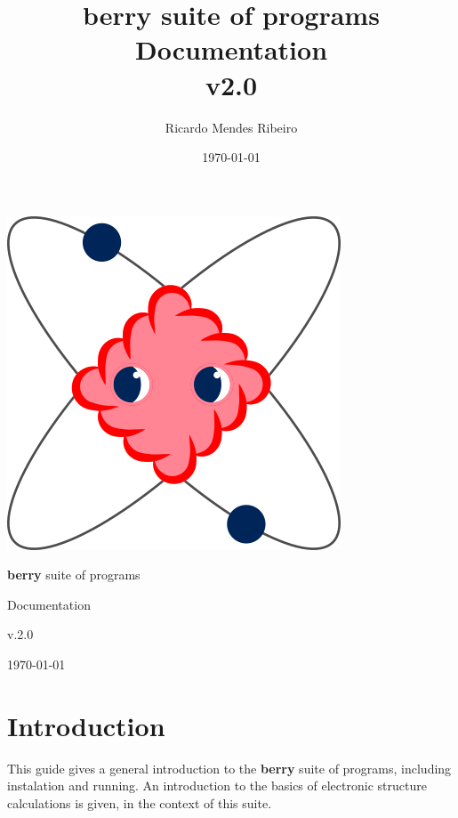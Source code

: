 \documentclass[a4paper,12pt]{report}
\title{{\bf berry} suite of programs\\
\large Documentation \\
v2.0}
\author{Ricardo Mendes Ribeiro}
\date{\today}
\begin{document}
\begin{titlepage}
 \begin{center}
 \includegraphics[scale=0.3,keepaspectratio=true]{figures/BerryLogo.png}
 \end{center}
\vspace*{2cm}

 \begin{center}
  \begin{Huge}{\bf berry} suite of programs\end{Huge}
  \vspace*{1cm}

 \begin{LARGE}Documentation\end{LARGE}
  \vspace*{1cm}

\begin{Huge}v.2.0\end{Huge}
  \vspace*{12cm}

\today
 \end{center}
\end{titlepage}

\tableofcontents

\chapter{Introduction}\label{ch:introduction}

 This guide gives a general introduction to the \textbf{berry} suite of programs, including instalation and running.
 An introduction to the basics of electronic structure calculations is given, in the context of this suite.
\end{document}
